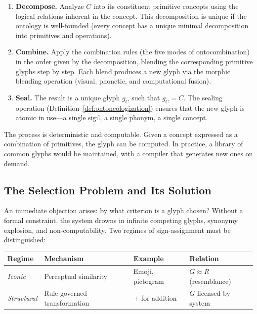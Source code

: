 \documentclass[12pt, letterpaper]{book}
\def\equiv{=}%
\def\mathfrak#1{#1}%
\begin{document}
\begin{enumerate}[label=\textbf{Step \arabic*:}]
    \item \textbf{Decompose.} Analyze $C$ into its constituent primitive concepts using the logical relations inherent in the concept. This decomposition is unique if the ontology is well-founded (every concept has a unique minimal decomposition into primitives and operations).
    \item \textbf{Combine.} Apply the combination rules (the five modes of ontocombination) in the order given by the decomposition, blending the corresponding primitive glyphs step by step. Each blend produces a new glyph via the morphic blending operation (visual, phonetic, and computational fusion).
    \item \textbf{Seal.} The result is a unique glyph $\mathfrak{g}_C$ such that $\mathfrak{g}_C \equiv C$. The sealing operation (Definition~\ref{def:ontoneologization}) ensures that the new glyph is atomic in use---a single sigil, a single phonym, a single concept.
\end{enumerate}

The process is deterministic and computable. Given a concept expressed as a combination of primitives, the glyph can be computed. In practice, a library of common glyphs would be maintained, with a compiler that generates new ones on demand.

\subsection{The Selection Problem and Its Solution}

An immediate objection arises: by what criterion is a glyph chosen? Without a formal constraint, the system drowns in infinite competing glyphs, synonymy explosion, and non-computability. Two regimes of sign-assignment must be distinguished:

\begin{center}
\begin{tabular}{llll}
\toprule
\textbf{Regime} & \textbf{Mechanism} & \textbf{Example} & \textbf{Relation} \\
\midrule
\textit{Iconic} & Perceptual similarity & Emoji, pictogram & $G \approx R$ (resemblance) \\
\textit{Structural} & Rule-governed transformation & $+$ for addition & $G$ licensed by system \\
\bottomrule
\end{tabular}
\end{center}
\end{document}
